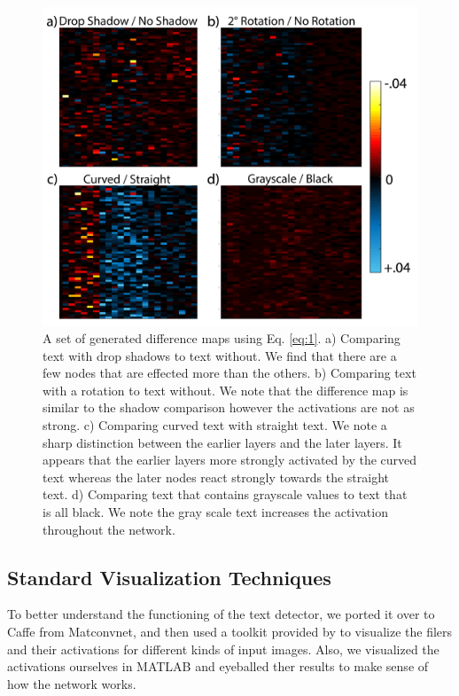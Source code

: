 \documentclass[10pt,twocolumn,letterpaper]{article}
\begin{document}
\begin{figure}
\includegraphics[width=\columnwidth]{Figures/diff_examples/diff_examples-01.png}
\caption{A set of generated difference maps using Eq. \ref{eq:1}. a) Comparing text with drop shadows to text without. We find that there are a few nodes that are effected more than the others. b) Comparing text with a rotation to text without. We note that the difference map is similar to the shadow comparison however the activations are not as strong. c) Comparing curved text with straight text. We note a sharp distinction between the earlier layers and the later layers. It appears that the earlier layers more strongly activated by the curved text whereas the later nodes react strongly towards the straight text. d) Comparing text that contains grayscale values to text that is all black. We note the gray scale text increases the activation throughout the network.}
\label{fig:diffexamples}
\end{figure}

\subsection{Standard Visualization Techniques}
To better understand the functioning of the text detector, we ported it over to Caffe from Matconvnet, and then used a toolkit provided by \cite{yosinski2015understanding} to visualize the filers and their activations for different kinds of input images. Also, we visualized the activations ourselves in MATLAB and eyeballed ther results to make sense of how the network works.
\end{document}
